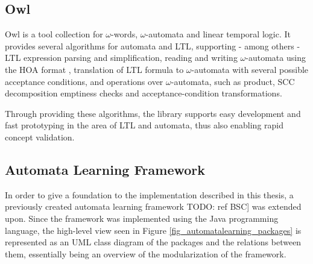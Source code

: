 \subsection{Owl} \label{subsec_owl}

Owl \cite{Owl} is a tool collection for $\omega$-words, $\omega$-automata and linear temporal logic. It provides several algorithms for automata and LTL, supporting - among others - LTL expression parsing and simplification, reading and writing $\omega$-automata using the HOA format \cite{HOAFormat}, translation of LTL formula to $\omega$-automata with several possible acceptance conditions, and operations over $\omega$-automata, such as product, SCC decomposition emptiness checks and acceptance-condition transformations.

Through providing these algorithms, the library supports easy development and fast prototyping in the area of LTL and automata, thus also enabling rapid concept validation.

\subsection{Automata Learning Framework} \label{subsec_automatonlearning}
In order to give a foundation to the implementation described in this thesis, a previously created automata learning framework TODO: ref BSC] was extended upon. Since the framework was implemented using the Java programming language, the high-level view seen in Figure \ref{fig_automatalearning_packages} is represented as an UML class diagram of the packages and the relations between them, essentially being an overview of the modularization of the framework. 


\smallskip

